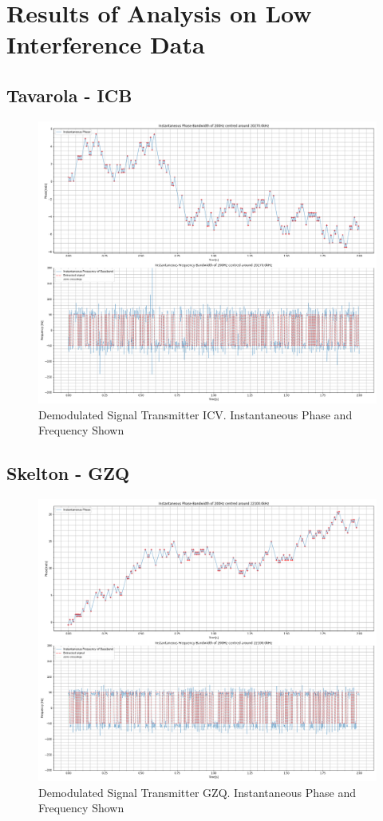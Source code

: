 \renewcommand{\thefigure}{B.\arabic{figure}}
\renewcommand{\thesection}{B.\arabic{section}}
\chapter{Results of Analysis on Low Interference Data}
\section{Tavarola - \textbf{ICB}}
\begin{figure}[h!]
    \centering
    \includegraphics[width = \textwidth]{figs/AppB/ICV.png}
    \caption{Demodulated Signal Transmitter ICV. Instantaneous Phase and Frequency Shown}
    \label{fig:ICV}
\end{figure}
\newpage
\section{Skelton - \textbf{GZQ}}
\begin{figure}[h!]
    \centering
    \includegraphics[width = \textwidth]{figs/AppB/GZQ.png}
    \caption{Demodulated Signal Transmitter GZQ. Instantaneous Phase and Frequency Shown}
    \label{fig:GZQ}
\end{figure}
\newpage
